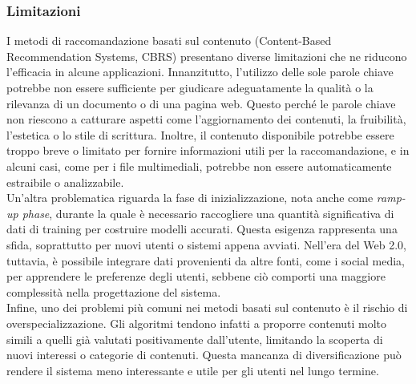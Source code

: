 \documentclass{report}
\begin{document}
	\subsubsection*{Limitazioni}  
	I metodi di raccomandazione basati sul contenuto (Content-Based Recommendation Systems, CBRS) presentano diverse limitazioni che ne riducono l'efficacia in alcune applicazioni. Innanzitutto, l'utilizzo delle sole parole chiave potrebbe non essere sufficiente per giudicare adeguatamente la qualità o la rilevanza di un documento o di una pagina web. Questo perché le parole chiave non riescono a catturare aspetti come l'aggiornamento dei contenuti, la fruibilità, l'estetica o lo stile di scrittura. Inoltre, il contenuto disponibile potrebbe essere troppo breve o limitato per fornire informazioni utili per la raccomandazione, e in alcuni casi, come per i file multimediali, potrebbe non essere automaticamente estraibile o analizzabile.
	\vspace{\baselineskip}\\
	Un'altra problematica riguarda la fase di inizializzazione, nota anche come \textit{ramp-up phase}, durante la quale è necessario raccogliere una quantità significativa di dati di training per costruire modelli accurati. Questa esigenza rappresenta una sfida, soprattutto per nuovi utenti o sistemi appena avviati. Nell'era del Web 2.0, tuttavia, è possibile integrare dati provenienti da altre fonti, come i social media, per apprendere le preferenze degli utenti, sebbene ciò comporti una maggiore complessità nella progettazione del sistema. 
	\vspace{\baselineskip}\\
	Infine, uno dei problemi più comuni nei metodi basati sul contenuto è il rischio di overspecializzazione. Gli algoritmi tendono infatti a proporre contenuti molto simili a quelli già valutati positivamente dall'utente, limitando la scoperta di nuovi interessi o categorie di contenuti. Questa mancanza di diversificazione può rendere il sistema meno interessante e utile per gli utenti nel lungo termine.   
\end{document}
